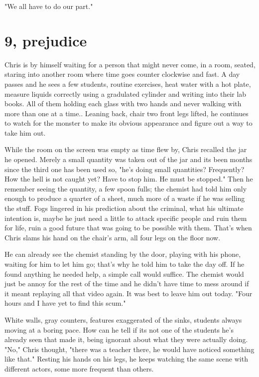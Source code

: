         "We all have to do our part."

\section{9, prejudice}

        Chris is by himself waiting for a person that might never come, in a room, seated, staring into another room where time goes counter
    clockwise and fast. A day passes and he sees a few students, routine exercises, heat water with a hot plate, measure liquids correctly
    using a gradulated cylinder and writing into their lab books. All of them holding each glass with two hands and never walking with more
    than one at a time.. Leaning back, chair two front legs lifted, he continues to watch for the monster to make its obvious appearance and
    figure out a way to take him out.

        While the room on the screen was empty as time flew by, Chris recalled the jar he opened. Merely a small quantity was taken out of the
    jar and its been months since the third one has been used so, "he's doing small quantities? Frequently? How the hell is not caught yet?
    Have to stop him. He must be stopped." Then he remember seeing the quantity, a few spoon fulls; the chemist had told him only enough to
    produce a quarter of a sheet, much more of a waste if he was selling the stuff. Fogs lingered in his prediction about the criminal, what
    his ultimate intention is, maybe he just need a little to attack specific people and ruin them for life, ruin a good future that was going
    to be possible with them. That's when Chris slams his hand on the chair's arm, all four legs on the floor now.

        He can already see the chemist standing by the door, playing with his phone, waiting for him to let him go; that's why he told him to take
    the day off. If he found anything he needed help, a simple call would suffice. The chemist would just be annoy for the rest of the time and
    he didn't have time to mess around if it meant replaying all that video again. It was best to leave him out today. "Four hours and I have
    yet to find this scum."

        White walls, gray counters, features exaggerated of the sinks, students always moving at a boring pace. How can he tell if its not one
    of the students he's already seen that made it, being ignorant about what they were actually doing. "No," Chris thought, "there was a teacher
    there, he would have noticed something like that." Resting his hands on his legs, he keeps watching the same scene with different actors,
    some more frequent than others. 

